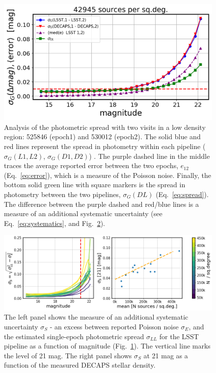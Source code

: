 \documentclass[DM,lsstdraft,toc,usenatbib,authoryear]{lsstdoc}
\begin{document}
\begin{figure}
\begin{centering}
\includegraphics[width=0.8\columnwidth]{figs/photometric_spread_2_525846-530012.png}
\caption{Analysis of the photometric spread with two visits in a low density region:  525846 (epoch1) and 530012 (epoch2). The solid blue and red lines represent the spread in photometry within each pipeline ($\sigma_{G}(L1,L2)$, $\sigma_{G}(D1,D2)$) . The purple dashed line in the middle traces the average reported error between the two epochs, $e_{12}$ (Eq.~\ref{eq:error}), which is a measure of the Poisson noise. Finally, the bottom solid green line with square markers is the spread in photometry between the two pipelines, $\sigma_{G}(DL)$ (Eq.~\ref{eq:spread}). The difference between the purple dashed and red/blue lines is a measure of an additional systematic uncertainty (see Eq.~\ref{eq:systematics}, and Fig.~\ref{fig:spread_summary}).}
\label{fig:spread}
\end{centering}
\end{figure}



\begin{figure}
\begin{centering}
\includegraphics[width=0.95\columnwidth]{figs/photometric_offset_combined.png}
\caption{The left panel shows the measure of an additional  systematic uncertainty $\sigma_{S}$ - an excess between reported Poisson noise $\sigma_{E}$, and the estimated single-epoch photometric spread $\sigma_{LL}$ for the LSST pipeline as a function of magnitude (Fig.~\ref{fig:spread}). The vertical line marks the level of 21 mag. The right panel shows $\sigma_{S}$ at 21 mag  as a function of the  measured DECAPS stellar density.}
\label{fig:spread_summary}
\end{centering}
\end{figure}
\end{document}
